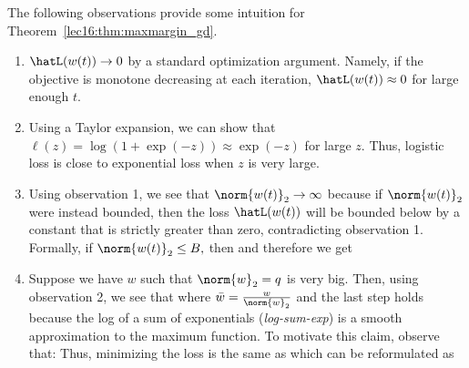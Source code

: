 The following observations provide some intuition for Theorem~\ref{lec16:thm:maxmargin_gd}.
\begin{enumerate}
    \item $\hatL(w(t)) \to 0$ by a standard optimization argument. Namely, if the objective is monotone decreasing at each iteration, $\hatL(w(t)) \approx 0$ for large enough $t$.
    \item Using a Taylor expansion, we can show that $ \ell(z) = \log(1 + \exp(-z)) \approx \exp(-z)$ for large $z$. Thus, logistic loss is close to exponential loss when $z$ is very large.
    \item Using observation 1, we see that $\norm{w(t)}_{2} \to \infty$ because if $\norm{w(t)}_{2}$ were instead bounded, then the loss $\hatL (w(t))$ will be bounded below by a constant that is strictly greater than zero, contradicting observation 1. Formally, if
    $\norm{w(t)}_{2} \leq B,$
    then
    and therefore we get
    \item Suppose we have $w$ such that $\norm{w}_{2} = q $ is very big. Then, using observation 2, we see that
    where $ \bar{w} = \frac{w}{\norm{w}_{2}}$ and the last step holds because the log of a sum of exponentials (\textit{log-sum-exp}) is a smooth approximation to the maximum function. To motivate this claim, observe that:  
    Thus, minimizing the loss is the same as
    which can be reformulated as

\end{enumerate}

